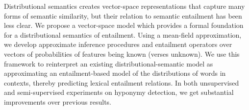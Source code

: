Distributional semantics creates vector-space representations that capture many forms of semantic similarity, but their relation to semantic entailment has been less clear.  We propose a vector-space model which provides a formal foundation for a distributional semantics of entailment.  Using a mean-field approximation, we develop approximate inference procedures and entailment operators over vectors of probabilities of features being known (verses unknown).  We use this framework to reinterpret an existing distributional-semantic model as approximating an entailment-based model of the distributions of words in contexts, thereby predicting lexical entailment relations.  In both unsupervised and semi-supervised experiments on hyponymy detection, we get substantial improvements over previous results.
